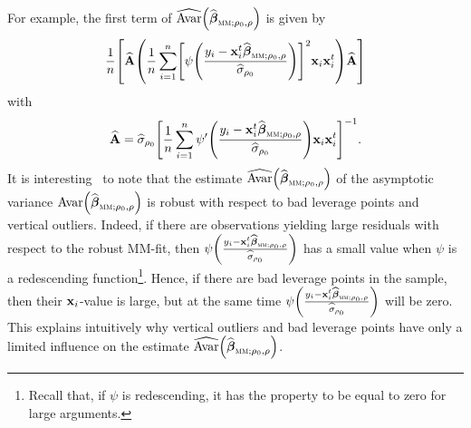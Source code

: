 For example, the first term of $\sthat{\mathrm{Avar}}\left(  \widehat
{\boldsymbol\beta}_{\stsc{MM};\rho_{0},\rho}\right)  $ is given by
\[
\frac{1}{n}\left[  \sthat{\mathbf{A}}\left(  \frac{1}{n}\sum_{i=1}%
^{n}\left[  \psi\left(  \frac{y_{i}-\stvec{x}_{i}^{t}\widehat
{\boldsymbol\beta}_{\stsc{MM};\rho_{0},\rho}}{\sthat{\sigma}_{\rho_{0}}%
}\right)  \right]  ^{2}\stvec{x}_{i}\stvec{x}_{i}^{t}\right)  \widehat
{\mathbf{A}}\right]
\]
with
\[
\sthat{\mathbf{A}}=\sthat{\sigma}_{\rho_{0}}\left[  \frac{1}{n}\sum
_{i=1}^{n}\psi^{\prime}\left(  \frac{y_{i}-\stvec{x}_{i}^{t}\widehat
{\boldsymbol\beta}_{\stsc{MM};\rho_{0},\rho}}{\sthat{\sigma}_{\rho_{0}}%
}\right)  \stvec{x}_{i}\stvec{x}_{i}^{t}\right]  ^{-1}.
\]
It is interesting \ to note that the estimate $\sthat{\mathrm{Avar}}\left(
\sthat{\boldsymbol\beta}_{\stsc{MM};\rho_{0},\rho}\right)  $ of the
asymptotic variance $\mathrm{Avar}\left(  \sthat{\boldsymbol\beta%
}_{\stsc{MM};\rho_{0},\rho}\right)  $ is robust with respect to bad leverage
points and vertical outliers. Indeed, if there are observations yielding large
residuals with respect to the robust MM-fit, then $\psi\left(  \frac
{y_{i}-\stvec{x}_{i}^{t}\sthat{\boldsymbol\beta}_{\stsc{MM};\rho
_{0},\rho}}{\sthat{\sigma}_{\rho_{0}}}\right)  $ has a small value when
$\psi$ is a redescending function\footnote{Recall that, if $\psi$ is
redescending, it has the property to be equal to zero for large arguments.}.
Hence, if there are bad leverage points in the sample, then their
$\mathbf x_{i}$-value is large, but at the same time $\psi\left(  \frac
{y_{i}-\stvec{x}_{i}^{t}\sthat{\boldsymbol\beta}_{\stsc{MM};\rho
_{0},\rho}}{\sthat{\sigma}_{\rho_{0}}}\right)  $ will be zero. This explains
intuitively why vertical outliers and bad leverage points have only a limited
influence on the estimate $\sthat{\mathrm{Avar}}\left(  \widehat
{\boldsymbol\beta}_{\stsc{MM};\rho_{0},\rho}\right)  $.

